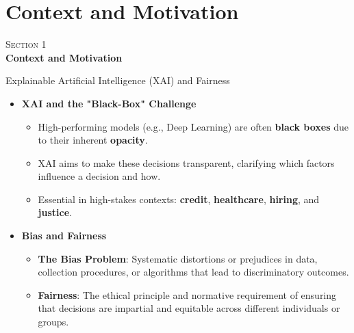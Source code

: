 \documentclass[10pt,aspectratio=169]{beamer}
\begin{document}
\section{Context and Motivation}

{
\begin{frame}[plain]
  \centering
  \vfill
  {\color{parthenopeblue}\large\textsc{Section 1}}\\[10pt]
  {\color{parthenopenavy}\Huge\bfseries Context and Motivation}
  \vfill
\end{frame}}

\begin{frame}{Explainable Artificial Intelligence (XAI) and Fairness}
  \begin{itemize}
    \item \textbf{XAI and the "Black-Box" Challenge}
    \begin{itemize}
        \item High-performing models (e.g., Deep Learning) are often \textbf{black boxes} due to their inherent \textbf{opacity}.
        \item XAI aims to make these decisions transparent, clarifying which factors influence a decision and how.
        \item Essential in high-stakes contexts: \textbf{credit}, \textbf{healthcare}, \textbf{hiring}, and \textbf{justice}.
    \end{itemize}
    
    \vspace{0.3cm}
    
    \item \textbf{Bias and Fairness}
    \begin{itemize}
        \item \textbf{The Bias Problem}: Systematic distortions or prejudices in data, collection procedures, or algorithms that lead to discriminatory outcomes.
        \item \textbf{Fairness}: The ethical principle and normative requirement of ensuring that decisions are impartial and equitable across different individuals or groups.
    \end{itemize}
  \end{itemize}
\end{frame}
\end{document}
